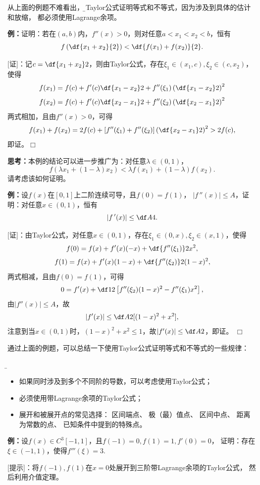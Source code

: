 从上面的例题不难看出，{\b 用Taylor公式证明等式和不等式，因为涉及到具体的估计和放缩，
都必须使用Lagrange余项}。

{\bf 例：}证明：若在$(a,b)$内，$f''(x)>0$，则对任意$a<x_1<x_2<b$，恒有
$$f\left(\df{x_1+x_2}{2}\right)<\df{f(x_1)+f(x_2)}{2}.$$

[证]：记$c=\df{x_1+x_2}2$，则由Taylor公式，存在$\xi_1\in(x_1,c),
\xi_2\in(c,x_2)$，使得
$$f(x_1)=f(c)+f'(c)\df{x_1-x_2}2+f''(\xi_1)
\left(\df{x_1-x_2}2\right)^2$$
$$f(x_2)=f(c)+f'(c)\df{x_2-x_1}2+f''(\xi_2)
\left(\df{x_2-x_1}2\right)^2$$
两式相加，且由$f''(x)>0$，可得
$$f(x_1)+f(x_2)=2f(c)+[f''(\xi_1)+f''(\xi_2)]
\left(\df{x_2-x_1}2\right)^2>2f(c),$$
即证。\hfill$\Box$

{\bf 思考：}本例的结论可以进一步推广为：对任意$\lambda\in(0,1)$，
$$f(\lambda x_1+(1-\lambda)x_2)<\lambda
f(x_1)+(1-\lambda)f(x_2).$$
请考虑该如何证明。

% 

{\bf 例：}设$f(x)$在$[0,1]$上二阶连续可导，且$f(0)=f(1)$，
$|f\,''(x)|\leq A$，证明：对任意$x\in(0,1)$，恒有
$$|f\,'(x)|\leq\df A4.$$

[证]：由Taylor公式，对任意$x\in(0,1)$，存在$\xi_1\in(0,x),
\xi_2\in(x,1)$，使得
$$f(0)=f(x)+f'(x)(-x)+\df{f''(\xi_1)}2x^2,$$
$$f(1)=f(x)+f'(x)(1-x)+\df{f''(\xi_2)}2(1-x)^2,$$
两式相减，且由$f(0)=f(1)$，可得
$$0=f'(x)+\df12\left[f''(\xi_2)(1-x)^2-f''(\xi_1)x^2\right],$$
由$|f''(x)|\leq A$，故
$$|f'(x)|\leq\df A2[(1-x)^2+x^2],$$
注意到当$x\in(0,1)$时，$(1-x)^2+x^2\leq1$，故$|f'(x)|\leq\df A2$，即证。
\hfill$\Box$

通过上面的例题，可以总结一下使用Taylor公式证明等式和不等式的一些规律：
{\b
\begin{itemize}
  \item 如果同时涉及到多个不同阶的导数，可以考虑使用Taylor公式；
  \item 必须使用带Lagrange余项的Taylor公式；
  \item 展开和被展开点的常见选择： 区间端点、 极（最）值点、
  区间中点、 距离为常数的点、 已知条件中提到的特殊点。
\end{itemize}
}

{\bf 例：}设$f(x)\in C^3[-1,1]$，且$f(-1)=0,f(1)=1,f'(0)=0$，
证明：存在$\xi\in(-1,1)$，使得$f'''(\xi)=3$.

[提示]：将$f(-1),f(1)$在$x=0$处展开到三阶带Lagrange余项的Taylor公式，
然后利用介值定理。

